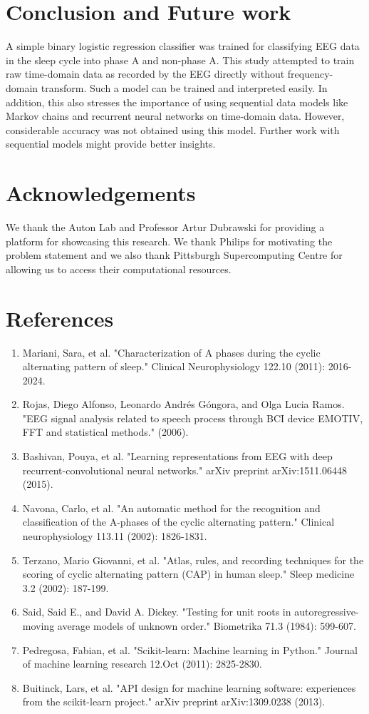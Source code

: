 \documentclass{article}
\begin{document}
\section{Conclusion and Future work}
A simple binary logistic regression classifier was trained for classifying EEG data in the sleep cycle into phase A and non-phase A. This study attempted to train raw time-domain data as recorded by the EEG directly without frequency-domain transform. Such a model can be trained and interpreted easily. In addition, this also stresses the importance of using sequential data models like Markov chains and recurrent neural networks on time-domain data. However, considerable accuracy was not obtained using this model. Further work with sequential models might provide better insights.

\section{Acknowledgements}
We thank the Auton Lab and Professor Artur Dubrawski for providing a platform for showcasing this research. We thank Philips for motivating the problem statement and we also thank Pittsburgh Supercomputing Centre for allowing us to access their computational resources.

\section{References}
\begin{enumerate}
\item Mariani, Sara, et al. "Characterization of A phases during the cyclic alternating pattern of sleep." Clinical Neurophysiology 122.10 (2011): 2016-2024.
\item Rojas, Diego Alfonso, Leonardo Andrés Góngora, and Olga Lucia Ramos. "EEG signal analysis related to speech process through BCI device EMOTIV, FFT and statistical methods." (2006).
\item Bashivan, Pouya, et al. "Learning representations from EEG with deep recurrent-convolutional neural networks." arXiv preprint arXiv:1511.06448 (2015).
 \item Navona, Carlo, et al. "An automatic method for the recognition and classification of the A-phases of the cyclic alternating pattern." Clinical neurophysiology 113.11 (2002): 1826-1831.

\item Terzano, Mario Giovanni, et al. "Atlas, rules, and recording techniques for the scoring of cyclic alternating pattern (CAP) in human sleep." Sleep medicine 3.2 (2002): 187-199.

\item Said, Said E., and David A. Dickey. "Testing for unit roots in autoregressive-moving average models of unknown order." Biometrika 71.3 (1984): 599-607.
\item Pedregosa, Fabian, et al. "Scikit-learn: Machine learning in Python." Journal of machine learning research 12.Oct (2011): 2825-2830.
\item Buitinck, Lars, et al. "API design for machine learning software: experiences from the scikit-learn project." arXiv preprint arXiv:1309.0238 (2013).

\end{enumerate}
\end{document}
